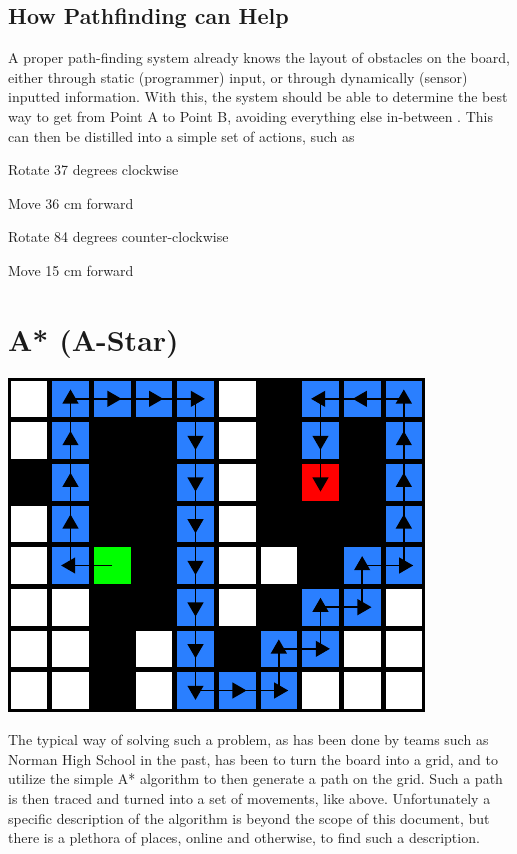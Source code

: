 \documentclass[letterpaper, 12pt]{article}
\begin{document}
\begin{multicols}{2}
\subsection{How Pathfinding can Help}

A proper path-finding system already knows the layout of obstacles on the board,
either through static (programmer) input, or through dynamically (sensor)
inputted information. With this, the system should be able to determine the best
way to get from Point A to Point B, avoiding everything else
in-between \cite{wikipathfinding}. This can then be distilled into a simple set
of actions, such as

\begin{enumerate*}
    \item Rotate 37 degrees clockwise
    \item Move 36 cm forward
    \item Rotate 84 degrees counter-clockwise
    \item Move 15 cm forward
\end{enumerate*}

\section{A* (A-Star)}

\includegraphics[width=\columnwidth]{img/a_star.pdf}

The typical way of solving such a problem, as has been done by teams such as
Norman High School in the past, has been to turn the board into a grid, and to
utilize the simple A* algorithm to then generate a path on the grid. Such a path
is then traced and turned into a set of movements, like above. Unfortunately a
specific description of the algorithm is beyond the scope of this document, but
there is a plethora of places, online and otherwise, to find such a description.
\cite{wikiastar}


\end{multicols}
\end{document}
